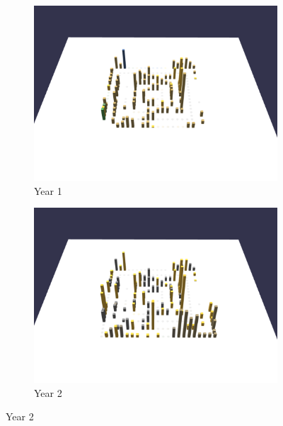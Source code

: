 \begin{figure}[ht]
    \begin{subfigure}{0.50\textwidth}
        \includegraphics[width=\linewidth]{JetUML_V3S1.png}
        \caption{Year 1} 
        \label{fig:JetUML_V3S1}
    \end{subfigure}\hspace*{\fill}
    \begin{subfigure}{0.50\textwidth}
        \includegraphics[width=\linewidth]{JetUML_V3S2.png}
        \caption{Year 2} 
        \label{fig:JetUML_V3S2}
    \end{subfigure}
    

\end{figure}
